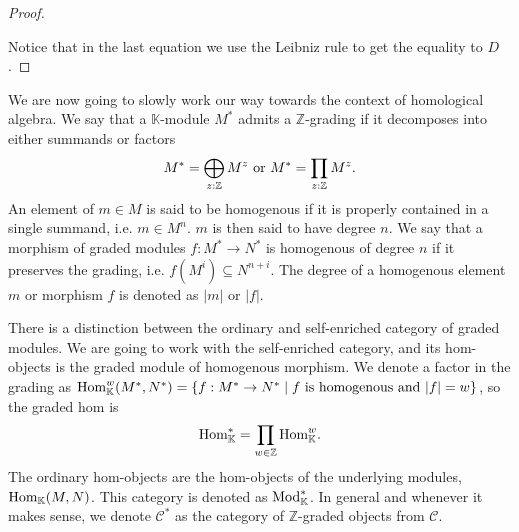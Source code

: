 \documentclass[../thesis.tex]{subfiles}
\begin{document}
\begin{proof}
\begin{center}
                \end{center}

                Notice that in the last equation we use the Leibniz rule to get the equality to $D$. 

            \end{proof}

            We are now going to slowly work our way towards the context of homological algebra. We say that a $\mathbb{K}$-module $M^*$ admits a $\mathbb{Z}$-grading if it decomposes into either summands or factors
            \begin{align*}
                M^* = \bigoplus_{z:\mathbb{Z}}M^z\tt{ or } M^* = \prod_{z:\mathbb{Z}}M^z\tt{.}
            \end{align*}
            An element of $m\in M$ is said to be homogenous if it is properly contained in a single summand, i.e. $m\in M^n$. $m$ is then said to have degree $n$. We say that a morphism of graded modules $f:M^*\rightarrow N^*$ is homogenous of degree $n$ if it preserves the grading, i.e.  $f(M^i) \subseteq N^{n+i}$. The degree of a homogenous element $m$ or morphism $f$ is denoted as $|m|$ or $|f|$.
            
            There is a distinction between the ordinary and self-enriched category of graded modules. We are going to work with the self-enriched category, and its hom-objects is the graded module of homogenous morphism. We denote a factor in the grading as $\tt{Hom}_\mathbb{K}^w(M^*,N^*)=\startset{f : M^* \rightarrow N^* \mid f\tt{ is homogenous and }|f|=w}$, so the graded hom is
            \begin{align*}
                \tt{Hom}_\mathbb{K}^* = \prod_{w\in\mathbb{Z}}\tt{Hom}_\mathbb{K}^w\tt{.}
            \end{align*}
            The ordinary hom-objects are the hom-objects of the underlying modules, $\tt{Hom}_\mathbb{K}(M,N)$. This category is denoted as $\tt{Mod}_\mathbb{K}^*$. In general and whenever it makes sense, we denote $\mathcal{C}^*$ as the category of $\mathbb{Z}$-graded objects from $\mathcal{C}$.
\end{document}
